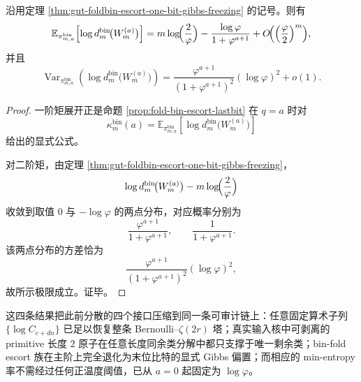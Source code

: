 \begin{corollary}\label{cor:gut-foldbin-escort-logfiber-first-second-moments}
沿用定理 \ref{thm:gut-foldbin-escort-one-bit-gibbs-freezing} 的记号。则有
\[
\mathbb E_{\pi_{m,a}^{\mathrm{bin}}}\!\left[\log d_m^{\mathrm{bin}}\!\bigl(W_m^{(a)}\bigr)\right]
=
m\log\!\Bigl(\frac{2}{\varphi}\Bigr)
-\frac{\log\varphi}{1+\varphi^{a+1}}
+O\!\Bigl(\Bigl(\frac{\varphi}{2}\Bigr)^m\Bigr),
\]
并且
\[
\operatorname{Var}_{\pi_{m,a}^{\mathrm{bin}}}\!\left(\log d_m^{\mathrm{bin}}\!\bigl(W_m^{(a)}\bigr)\right)
=
\frac{\varphi^{a+1}}{(1+\varphi^{a+1})^2}(\log\varphi)^2
+o(1).
\]
\end{corollary}
\begin{proof}
一阶矩展开正是命题 \ref{prop:fold-bin-escort-lastbit} 在 \(q=a\) 时对
\[
\kappa_m^{\mathrm{bin}}(a)
=
\mathbb E_{\pi_{m,a}^{\mathrm{bin}}}\!\left[\log d_m^{\mathrm{bin}}\!\bigl(W_m^{(a)}\bigr)\right]
\]
给出的显式公式。

对二阶矩，由定理 \ref{thm:gut-foldbin-escort-one-bit-gibbs-freezing}，
\[
\log d_m^{\mathrm{bin}}\!\bigl(W_m^{(a)}\bigr)-m\log\!\Bigl(\frac{2}{\varphi}\Bigr)
\]
收敛到取值 \(0\) 与 \(-\log\varphi\) 的两点分布，对应概率分别为
\[
\frac{\varphi^{a+1}}{1+\varphi^{a+1}},
\qquad
\frac{1}{1+\varphi^{a+1}}.
\]
该两点分布的方差恰为
\[
\frac{\varphi^{a+1}}{(1+\varphi^{a+1})^2}(\log\varphi)^2,
\]
故所示极限成立。证毕。
\end{proof}

这四条结果把此前分散的四个接口压缩到同一条可审计链上：任意固定算术子列 \(\{\log C_{c+dn}\}\) 已足以恢复整条 Bernoulli--\(\zeta(2r)\) 塔；真实输入核中可剥离的 primitive 长度 \(2\) 原子在任意长度同余类分解中都只支撑于唯一剩余类；bin-fold escort 族在主阶上完全退化为末位比特的显式 Gibbs 偏置；而相应的 min-entropy 率不需经过任何正温度阈值，已从 \(a=0\) 起固定为 \(\log\varphi\)。
